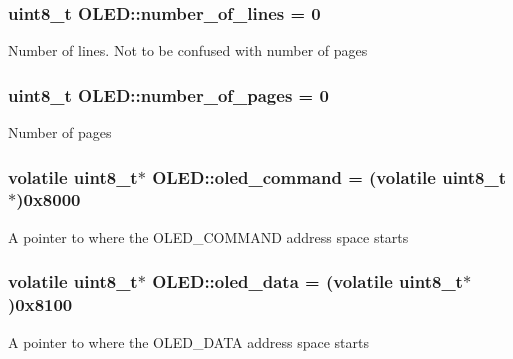 \subsubsection[{\texorpdfstring{number\+\_\+of\+\_\+lines}{number_of_lines}}]{\setlength{\rightskip}{0pt plus 5cm}uint8\+\_\+t O\+L\+E\+D\+::number\+\_\+of\+\_\+lines = 0\hspace{0.3cm}{\ttfamily [private]}}\hypertarget{class_o_l_e_d_a9ea1c55112deede1a61142af276a6bc9}{}\label{class_o_l_e_d_a9ea1c55112deede1a61142af276a6bc9}
Number of lines. Not to be confused with number of pages 
\subsubsection[{\texorpdfstring{number\+\_\+of\+\_\+pages}{number_of_pages}}]{\setlength{\rightskip}{0pt plus 5cm}uint8\+\_\+t O\+L\+E\+D\+::number\+\_\+of\+\_\+pages = 0\hspace{0.3cm}{\ttfamily [private]}}\hypertarget{class_o_l_e_d_aaac99b0eb4e9dfe92b8571488dc89288}{}\label{class_o_l_e_d_aaac99b0eb4e9dfe92b8571488dc89288}
Number of pages 
\subsubsection[{\texorpdfstring{oled\+\_\+command}{oled_command}}]{\setlength{\rightskip}{0pt plus 5cm}volatile uint8\+\_\+t$\ast$ O\+L\+E\+D\+::oled\+\_\+command = (volatile uint8\+\_\+t$\ast$)0x8000\hspace{0.3cm}{\ttfamily [private]}}\hypertarget{class_o_l_e_d_af0a85ccd0274347b8c1ac77d298a14cf}{}\label{class_o_l_e_d_af0a85ccd0274347b8c1ac77d298a14cf}
A pointer to where the O\+L\+E\+D\+\_\+\+C\+O\+M\+M\+A\+ND address space starts 
\subsubsection[{\texorpdfstring{oled\+\_\+data}{oled_data}}]{\setlength{\rightskip}{0pt plus 5cm}volatile uint8\+\_\+t$\ast$ O\+L\+E\+D\+::oled\+\_\+data = (volatile uint8\+\_\+t$\ast$)0x8100\hspace{0.3cm}{\ttfamily [private]}}\hypertarget{class_o_l_e_d_a1bc54d49808f92ddfc354511b692df6f}{}\label{class_o_l_e_d_a1bc54d49808f92ddfc354511b692df6f}
A pointer to where the O\+L\+E\+D\+\_\+\+D\+A\+TA address space starts 
